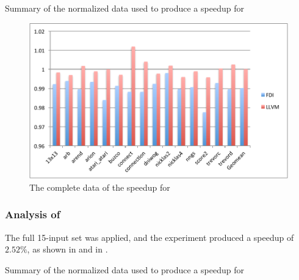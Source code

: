 \begin{table}
  \centering
  \begin{tiny}
  
  \end{tiny}
  \caption{Summary of the normalized data used to produce a speedup for \gcc}
  \label{tab:fullspeedupgbk}
\end{table}

\begin{figure}
  \centering
  \includegraphics[width=1.00\linewidth]{Figures/speedupgbkall}
  \caption{The complete data of the speedup for \gobmk}
  \label{fig:gobmkall}
\end{figure}


\subsubsection{Analysis of \gcc}


The full 15-input set was applied, and the experiment produced a speedup of $2.52 \%$, as shown in  and in .

\begin{table}
  \centering
  \begin{tiny}
  
  \end{tiny}
  \caption{Summary of the normalized data used to produce a speedup for \gcc}
  \label{tab:fullspeedup}
\end{table}

